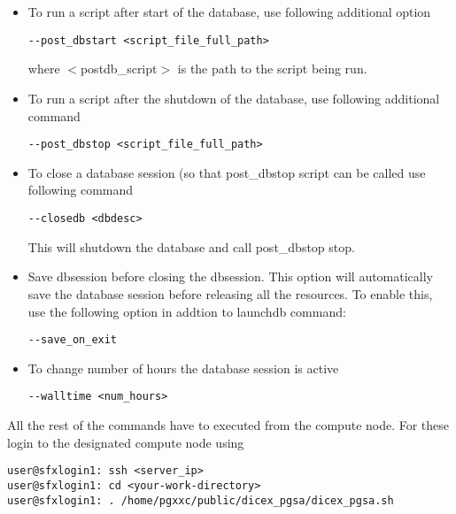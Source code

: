 \documentclass[10,twocolumn]{article}
\begin{document}
\paragraph{}\hfill\\
\begin{itemize}
\topsep=0pt\itemsep=0pt
\item To run a script after start of the database, use following additional option\hfill\\
\begin{lstlisting}[style=mystyle]
--post_dbstart <script_file_full_path>
\end{lstlisting}
where $<$postdb\_script$>$ is the path to the script being run.
\item To run a  script after the shutdown of the database, use following additional command\hfill\\
\begin{lstlisting}[style=mystyle]
--post_dbstop <script_file_full_path>
\end{lstlisting}
\item To close a database session (so that post\_dbstop script can be called use following command \hfill\\
\begin{lstlisting}[style=mystyle]
--closedb <dbdesc>
\end{lstlisting}
This will shutdown the database and call post\_dbstop stop.
\item Save dbsession before closing the dbsession. This option will automatically save the database session before releasing 
all the resources. To enable this, use the following option in addtion to launchdb command:
\begin{lstlisting}[style=mystyle]
--save_on_exit
\end{lstlisting}
\item To change number of hours the database session is active
  \begin{lstlisting}[style=mystyle]
--walltime <num_hours>
  \end{lstlisting}
  
\end{itemize}




All the rest of the commands have to executed from the compute node. For these login 
to the designated compute node using
\begin{lstlisting}[style=mystyle]
user@sfxlogin1: ssh <server_ip>
user@sfxlogin1: cd <your-work-directory>
user@sfxlogin1: . /home/pgxxc/public/dicex_pgsa/dicex_pgsa.sh
\end{lstlisting}
\end{document}
